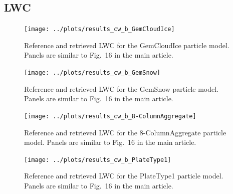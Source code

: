 \documentclass[journal abbreviation, manuscript]{copernicus}
\begin{document}
\subsection{LWC}

\begin{figure}[!hbpt]
\centering
\texttt{[image: ../plots/results\_cw\_b\_GemCloudIce]}
\caption{Reference and retrieved LWC for the GemCloudIce particle model. Panels are similar to
Fig.~16 in the main article.}
\end{figure}
\clearpage

\begin{figure}[!hbpt]
\centering
\texttt{[image: ../plots/results\_cw\_b\_GemSnow]}
\caption{Reference and retrieved LWC for the GemSnow particle model. Panels are similar to
Fig.~16 in the main article.}
\end{figure}
\clearpage

\begin{figure}[!hbpt]
\centering
\texttt{[image: ../plots/results\_cw\_b\_8-ColumnAggregate]}
\caption{Reference and retrieved LWC for the 8-ColumnAggregate particle model. Panels are similar to
Fig.~16 in the main article.}
\end{figure}
\clearpage

\begin{figure}[!hbpt]
\centering
\texttt{[image: ../plots/results\_cw\_b\_PlateType1]}
\caption{Reference and retrieved LWC for the PlateType1 particle model. Panels are similar to
Fig.~16 in the main article.}
\end{figure}
\clearpage

\noappendix       %
\end{document}
